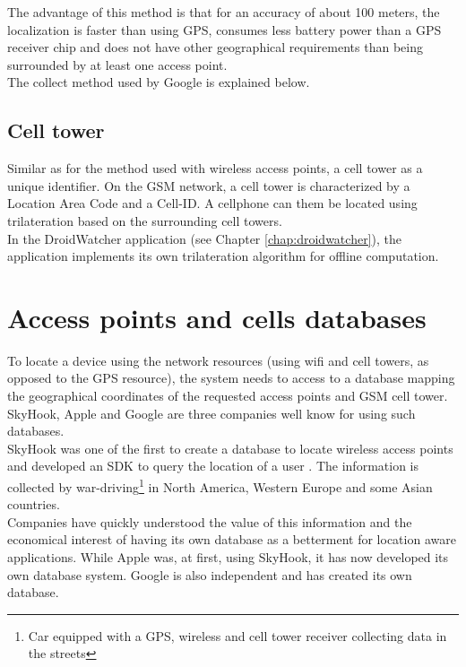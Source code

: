 The advantage of this method is that for an accuracy of about 100 meters, the localization is faster than using GPS, consumes less battery power than a GPS receiver chip and does not have other geographical requirements than being surrounded by at least one access point.\\

The collect method used by Google is explained below.

\subsection{Cell tower}
Similar as for the method used with wireless access points, a cell tower as a unique identifier.
On the GSM network, a cell tower is characterized by a Location Area Code and a Cell-ID.
A cellphone can them be located using trilateration based on the surrounding cell towers.\\

In the DroidWatcher application (see Chapter \ref{chap:droidwatcher}), the application implements its own trilateration algorithm for offline computation.


\section{Access points and cells databases}
\label{sec:andro-cell-db}

To locate a device using the network resources (using wifi and cell towers, as opposed to the GPS resource), the system needs to access to a database mapping the geographical coordinates of the requested access points and GSM cell tower.
SkyHook, Apple and Google are three companies well know for using such databases.\\

SkyHook was one of the first to create a database to locate wireless access points and developed an SDK to query the location of a user .
The information is collected by war-driving\footnote{Car equipped with a GPS, wireless and cell tower receiver collecting data in the streets} in North America, Western Europe and some Asian countries\cite{skyhook-coverage}.\\

Companies have quickly understood the value of this information and the economical interest of having its own database as a betterment for location aware applications.
While Apple was, at first, using SkyHook, it has now developed its own database system.
Google is also independent and has created its own database.\\

